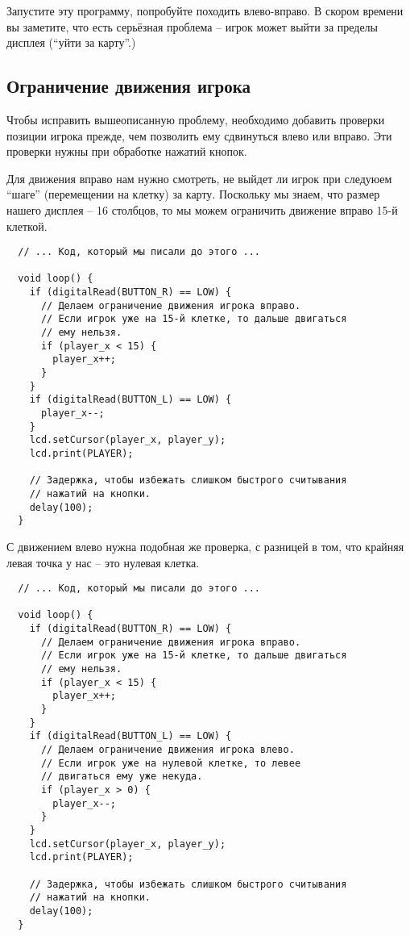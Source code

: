 \documentclass[../sparc.tex]{subfiles}
\begin{document}
Запустите эту программу, попробуйте походить влево-вправо.  В скором времени вы
заметите, что есть серьёзная проблема -- игрок может выйти за пределы дисплея
(``уйти за карту''.)

\subsection{Ограничение движения игрока}

Чтобы исправить вышеописанную проблему, необходимо добавить проверки позиции
игрока прежде, чем позволить ему сдвинуться влево или вправо.  Эти проверки
нужны при обработке нажатий кнопок.

Для движения вправо нам нужно смотреть, не выйдет ли игрок при следуюем ``шаге''
(перемещении на клетку) за карту.  Поскольку мы знаем, что размер нашего дисплея
-- 16 столбцов, то мы можем ограничить движение вправо 15-й клеткой.

\begin{verbatim}
  // ... Код, который мы писали до этого ...

  void loop() {
    if (digitalRead(BUTTON_R) == LOW) {
      // Делаем ограничение движения игрока вправо.
      // Если игрок уже на 15-й клетке, то дальше двигаться
      // ему нельзя.
      if (player_x < 15) {
        player_x++;
      }
    }
    if (digitalRead(BUTTON_L) == LOW) {
      player_x--;
    }
    lcd.setCursor(player_x, player_y);
    lcd.print(PLAYER);

    // Задержка, чтобы избежать слишком быстрого считывания
    // нажатий на кнопки.
    delay(100);
  }
\end{verbatim}

С движением влево нужна подобная же проверка, с разницей в том, что крайняя
левая точка у нас -- это нулевая клетка.

\begin{verbatim}
  // ... Код, который мы писали до этого ...

  void loop() {
    if (digitalRead(BUTTON_R) == LOW) {
      // Делаем ограничение движения игрока вправо.
      // Если игрок уже на 15-й клетке, то дальше двигаться
      // ему нельзя.
      if (player_x < 15) {
        player_x++;
      }
    }
    if (digitalRead(BUTTON_L) == LOW) {
      // Делаем ограничение движения игрока влево.
      // Если игрок уже на нулевой клетке, то левее
      // двигаться ему уже некуда.
      if (player_x > 0) {
        player_x--;
      }
    }
    lcd.setCursor(player_x, player_y);
    lcd.print(PLAYER);

    // Задержка, чтобы избежать слишком быстрого считывания
    // нажатий на кнопки.
    delay(100);
  }
\end{verbatim}
\end{document}
